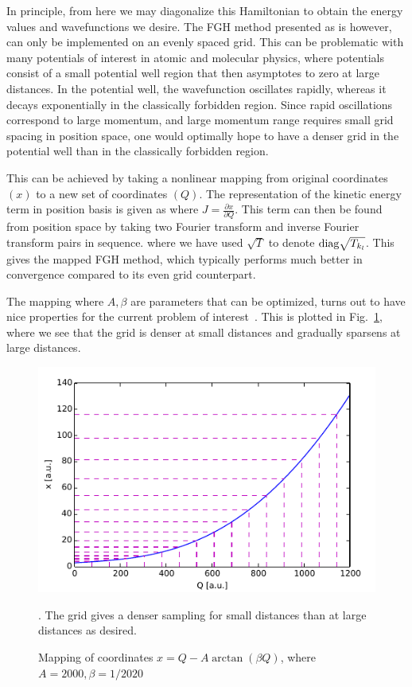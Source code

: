 \documentclass[%
 reprint,
 amsmath,amssymb,
 aps,
 nofootinbib
]{revtex4-1}
\begin{document}
In principle, from here we may diagonalize this Hamiltonian to obtain the energy values and wavefunctions we desire. The FGH method presented as is however, can only be implemented on an evenly spaced grid. This can be problematic with many potentials of interest in atomic and molecular physics, where potentials consist of a small potential well region that then asymptotes to zero at large distances. In the potential well, the wavefunction oscillates rapidly, whereas it decays exponentially in the classically forbidden region. Since rapid oscillations correspond to large momentum, and large momentum range requires small grid spacing in position space, one would optimally hope to have a denser grid in the potential well than in the classically forbidden region.

This can be achieved by taking a nonlinear mapping from original coordinates $(x)$ to a new set of coordinates $(Q)$. The representation of the kinetic energy term in position basis is given as 
where $J=\frac{\partial x}{\partial Q}$. This term can then be found from position space by taking two Fourier transform and inverse Fourier transform pairs in sequence. 
where we have used $\sqrt{T}$ to denote $\text{diag}{\sqrt{T_{k_l}}}$. This gives the mapped FGH method, which typically performs much better in convergence compared to its even grid counterpart.

The mapping 
where $A,\beta$ are parameters that can be optimized, turns out to have nice properties for the current problem of interest~\cite{fattel1996}. This is plotted in Fig.~\ref{fig:mapping}, where we see that the grid is denser at small distances and gradually sparsens at large distances.

\begin{figure}
\includegraphics{figures/mapping}
\caption{\label{fig:mapping}Mapping of coordinates $x = Q-A\arctan(\beta Q)$, where $A=2000, \beta = 1/2020$}. The grid gives a denser sampling for small distances than at large distances as desired.
\end{figure}
\end{document}
